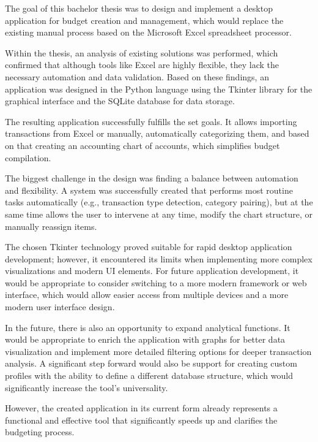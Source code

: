 \documentclass[
program=itk,
biblatex,
language=czech,
font=sans,
figures=true,
tables=false,
sourcecodes=false,
glossaries,
index
]{kidiplom}
\begin{document}
\begin{kiconclusions}[english]
The goal of this bachelor thesis was to design and implement a desktop application for budget creation and management, which would replace the existing manual process based on the Microsoft Excel spreadsheet processor.

Within the thesis, an analysis of existing solutions was performed, which confirmed that although tools like Excel are highly flexible, they lack the necessary automation and data validation. Based on these findings, an application was designed in the Python language using the Tkinter library for the graphical interface and the SQLite database for data storage.

The resulting application successfully fulfills the set goals. It allows importing transactions from Excel or manually, automatically categorizing them, and based on that creating an accounting chart of accounts, which simplifies budget compilation.

The biggest challenge in the design was finding a balance between automation and flexibility. A system was successfully created that performs most routine tasks automatically (e.g., transaction type detection, category pairing), but at the same time allows the user to intervene at any time, modify the chart structure, or manually reassign items.

The chosen Tkinter technology proved suitable for rapid desktop application development; however, it encountered its limits when implementing more complex visualizations and modern UI elements. For future application development, it would be appropriate to consider switching to a more modern framework or web interface, which would allow easier access from multiple devices and a more modern user interface design.

In the future, there is also an opportunity to expand analytical functions. It would be appropriate to enrich the application with graphs for better data visualization and implement more detailed filtering options for deeper transaction analysis. A significant step forward would also be support for creating custom profiles with the ability to define a different database structure, which would significantly increase the tool's universality.

However, the created application in its current form already represents a functional and effective tool that significantly speeds up and clarifies the budgeting process.
\end{kiconclusions}
\end{document}
